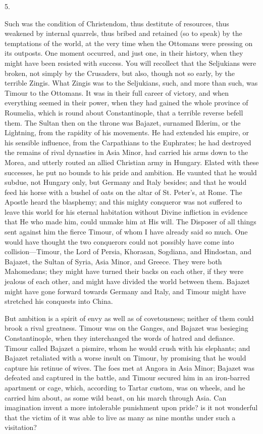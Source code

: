 5.

Such was the condition of
Christendom, thus destitute of resources, thus weakened by internal
quarrels, thus bribed and retained (so to speak) by the temptations of
the world, at the very time when the Ottomans were pressing on its
outposts. One moment occurred, and just one, in their history, when
they might have been resisted with success. You will recollect that
the Seljukians were broken, not simply by the Crusaders, but also,
though not so early, by the terrible Zingis. What Zingis was to the
Seljukians, such, and more than such, was Timour to the Ottomans. It
was in their full career of victory, and when everything seemed in
their power, when they had gained the whole province of Roumelia,
which is round about Constantinople, that a terrible reverse befell
them. The Sultan then on the throne was Bajazet, surnamed Ilderim, or
the Lightning, from the rapidity of his movements. He had extended his
empire, or his sensible influence, from the Carpathians to the
Euphrates; he had destroyed the remains of rival dynasties in Asia
Minor, had carried his arms down to the Morea, and utterly routed an
allied Christian army in Hungary. Elated with these successes, he put
no bounds to his pride and ambition. He vaunted that he would subdue,
not Hungary only, but Germany and Italy besides; and that he would
feed his horse with a bushel of oats on the altar of St. Peter's,
at Rome. The Apostle heard the blasphemy; and this mighty conqueror
was not suffered to leave this world for his eternal habitation
without Divine infliction in evidence that He who made him, could
unmake him at His will. The Disposer of all things sent against him
the fierce Timour, of whom I have already said so much. One would have
thought the two conquerors could not possibly have come into
collision—Timour, the Lord of Persia, Khorasan, Sogdiana, and
Hindostan, and Bajazet, the Sultan of Syria, Asia Minor, and Greece.
They were both Mahomedans; they might have turned their backs on each
other, if they were jealous of each other, and might have divided the
world between them. Bajazet might have gone forward towards Germany
and Italy, and Timour might have stretched his conquests into China.

But ambition is a spirit of
envy as well as of covetousness; neither of them could brook a rival
greatness. Timour was on the Ganges, and Bajazet was besieging
Constantinople, when they interchanged the words of hatred and
defiance. Timour called Bajazet a pismire, whom he would crush with
his elephants; and Bajazet retaliated with a worse insult on Timour,
by promising that he would capture his retinue of wives. The foes met
at Angora in Asia Minor; Bajazet was defeated and captured in the
battle, and Timour secured him in an iron-barred apartment or cage,
which, according to Tartar custom, was on wheels, and he carried him
about, as some wild beast, on his march through Asia. Can imagination
invent a more intolerable punishment upon pride? is it not wonderful
that the victim of it was able to live as many as nine months under
such a visitation?

